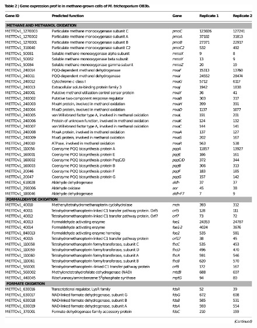 \begin{figure}[H]
\centering
     \includegraphics[width=1.0\textwidth]{./tex/chapter1/figures/matsen_OB3b_table2_piece1--cropped.pdf}
\end{figure}

